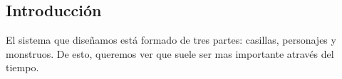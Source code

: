 

\subsection*{Introducción}{
    El sistema que diseñamos está formado de tres partes: casillas, personajes y
    monstruos.
    De esto, queremos ver que suele ser mas importante através del tiempo.
}

